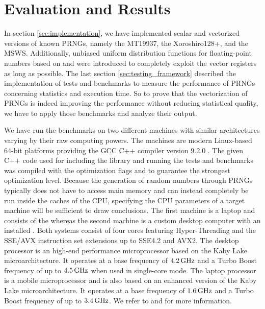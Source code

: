 \documentclass{stdlocal}
\begin{document}
\section{Evaluation and Results} %
\label{sec:evaluation}
  In section \ref{sec:implementation}, we have implemented scalar and vectorized versions of known PRNGs, namely the MT19937, the Xoroshiro128+, and the MSWS.
  Additionally, unbiased uniform distribution functions for floating-point numbers based on \textcite[\ppno~55-56]{kneusel2018} and \textcite{vigna-xoroshiro} were introduced to completely exploit the vector registers as long as possible.
  The last section \ref{sec:testing_framework} described the implementation of tests and benchmarks to measure the performance of PRNGs concerning statistics and execution time.
  So to prove that the vectorization of PRNGs is indeed improving the performance without reducing statistical quality, we have to apply those benchmarks and analyze their output.

  We have run the benchmarks on two different machines with similar architectures varying by their raw computing powers.
  The machines are modern Linux-based 64-bit platforms providing the GCC C++ compiler version 9.2.0 \autocite{gcc}.
  The given C++ code used for including the library and running the tests and benchmarks was compiled with the optimization flags  and  to guarantee the strongest optimization level.
  Because the generation of random numbers through PRNGs typically does not have to access main memory and can instead completely be run inside the caches of the CPU, specifying the CPU parameters of a target machine will be sufficient to draw conclusions.
  The first machine is a laptop and consists of the  \autocite{intel-kaby-lake-i5} whereas the second machine is a custom desktop computer with an installed  \autocite{intel-kaby-lake-i7}.
  Both systems consist of four cores featuring Hyper-Threading and the SSE/AVX instruction set extensions up to SSE4.2 and AVX2.
  The desktop processor is an high-end performance microprocessor based on the Kaby Lake microarchitecture.
  It operates at a base frequency of $4.2\, \mathrm{GHz}$ and a Turbo Boost frequency of up to $4.5\, \mathrm{GHz}$ when used in single-core mode.
  The laptop processor is a mobile microprocessor and is also based on an enhanced version of the Kaby Lake microarchitecture.
  It operates at a base frequency of $1.6\, \mathrm{GHz}$ and a Turbo Boost frequency of up to $3.4\, \mathrm{GHz}$.
  We refer to \textcite{intel-kaby-lake-i5} and \textcite{intel-kaby-lake-i7} for more information.
\end{document}
